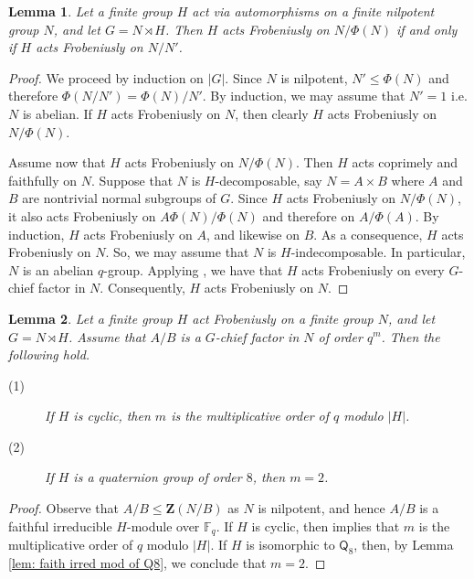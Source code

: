 \documentclass[9pt]{article}
\newtheorem{lem}{\bf Lemma}[section]
\begin{document}
\begin{lem}\label{lem: Frobeniusly action}
	Let a finite group $H$ act via automorphisms on a finite nilpotent group $N$, and let $G=N \rtimes H$.
	Then $H$ acts Frobeniusly on $N/\Phi(N)$
    if and only if $H$ acts Frobeniusly on $N/N'$.
\end{lem}
\begin{proof}
  We proceed by induction on $|G|$.
Since $N$ is nilpotent, $N'\le\Phi(N)$ and therefore $\Phi(N/N')=\Phi(N)/N'$.
   By induction, we may assume that $N'=1$ i.e. $N$ is abelian.
   If $H$ acts Frobeniusly on $N$, then clearly $H$ acts Frobeniusly on $N/\Phi(N)$. 
	



   Assume now that $H$ acts Frobeniusly on $N/\Phi(N)$.
	Then $H$ acts coprimely and faithfully on $N$.
   Suppose that  $N$ is $H$-decomposable, say $N=A\times B$ where $A$ and $B$ are nontrivial normal subgroups of $G$.
   Since $H$ acts Frobeniusly on $N/\Phi(N)$, it also acts Frobeniusly on $A\Phi(N)/\Phi(N)$ and therefore on $A/\Phi(A)$.
   By induction, $H$ acts Frobeniusly on $A$, and likewise on $B$.
   As a consequence, $H$ acts Frobeniusly on $N$.
   So, we may assume that $N$ is $H$-indecomposable.
   In particular, $N$ is an abelian $q$-group.
    Applying \cite[Corollary 1]{harris1977}, 
    we have that $H$ acts Frobeniusly on every $G$-chief factor in $N$.
	Consequently, $H$ acts Frobeniusly on $N$.
\end{proof}


\begin{lem}\label{lem: size of chief factor in Frob ker}
	Let a finite group $H$ act Frobeniusly on a finite group $N$, and let $G=N \rtimes H$.
	Assume that $A/B$ is a $G$-chief factor in $N$ of order $q^{m}$.
	Then the following hold.
	\begin{description}
		\item[(1)] If $H$ is cyclic, then $m$ is the multiplicative order of $q$ modulo $|H|$.
		\item[(2)] If $H$ is a quaternion group of order $8$, then $m=2$.
	\end{description}
\end{lem}
\begin{proof}
	Observe that $A/B\leq \mathbf{Z}(N/B)$ as $N$ is nilpotent,
	and hence $A/B$ is a faithful irreducible $H$-module over $\mathbb{F}_q$.
 If $H$ is cyclic, 
   then \cite[Chapter B, Theorem 9.8]{doerk1992} implies that $m$ is the multiplicative order of $q$ modulo $|H|$. 
  If $H$ is isomorphic to $\mathsf{Q}_8$,
  then, by Lemma \ref{lem: faith irred mod of Q8}, we conclude that $m=2$.
\end{proof}
\end{document}

